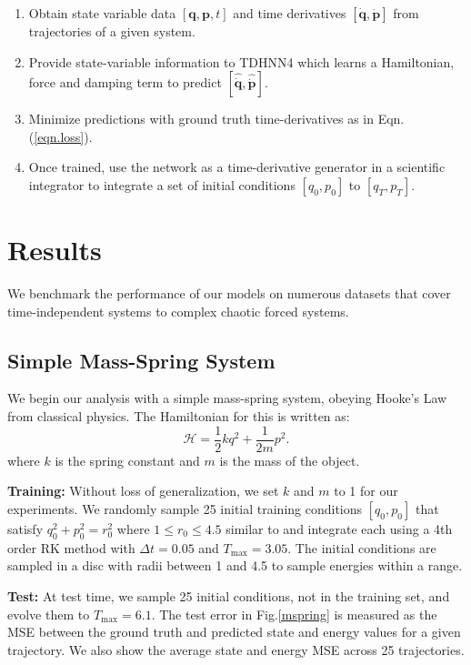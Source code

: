 \documentclass{article}
\begin{document}
\begin{enumerate}
\item Obtain state variable data $[\mathbf{q},\mathbf{p},t]$ and time derivatives $[\dot{\mathbf{q}},\dot{\mathbf{p}}]$ from trajectories of a given system.
\item Provide state-variable information to TDHNN4 which learns a Hamiltonian, force and damping term to predict $[\hat{\dot{\mathbf{q}}},\hat{\dot{\mathbf{p}}}]$.
\item Minimize predictions with ground truth time-derivatives as in Eqn.(\ref{eqn.loss}).
\item Once trained, use the network as a time-derivative generator in a scientific integrator to integrate a set of initial conditions $[q_0,p_0]$ to $[q_T,p_T]$.
\end{enumerate}


\section{Results}

We benchmark the performance of our models on numerous datasets that cover time-independent systems to complex chaotic forced systems. 

\subsection{Simple Mass-Spring System}

We begin our analysis with a simple mass-spring system, obeying Hooke's Law from classical physics. The Hamiltonian for this is written as:
\begin{equation}
\mathcal{H} = \frac{1}{2}kq^2 + \frac{1}{2m}p^2. 
\end{equation}
where $k$ is the spring constant and $m$ is the mass of the object. 

\textbf{Training:} Without loss of generalization, we set $k$ and $m$ to 1 for our experiments. We randomly sample 25 initial training conditions $[q_0,p_0]$ that satisfy $q_0^2+p_0^2 = r_0^2$ where $1 \leq r_0 \leq 4.5$ similar to \cite{greydanus_hamiltonian_2019} and integrate each using a 4th order RK method with $\Delta t =0.05$ and $T_{\max} = 3.05$. The initial conditions are sampled in a disc with radii between 1 and 4.5 to sample energies within a range.

\textbf{Test:} At test time, we sample 25 initial conditions, not in the training set, and evolve them to $T_{\max}=6.1$. The test error in Fig.\ref{mspring} is measured as the MSE between the ground truth and predicted state and energy values for a given trajectory. We also show the average state and energy MSE across 25 trajectories. 
\end{document}
